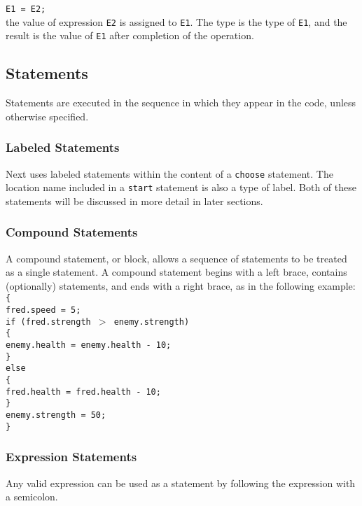 \documentclass[12pt]{article}
\begin{document}
\texttt{E1 = E2;} \\

\noindent the value of expression \texttt{E2} is assigned to \texttt{E1}.  The type is the type of \texttt{E1}, and the result is the value of \texttt{E1} after completion of the operation.

\subsection{Statements}
Statements are executed in the sequence in which they appear in the code, unless otherwise specified.

\subsubsection{Labeled Statements}
Next uses labeled statements within the content of a \texttt{choose} statement.  The location name included in a \texttt{start} statement is also a type of label.  Both of these statements will be discussed in more detail in later sections.

\subsubsection{Compound Statements}
A compound statement, or block, allows a sequence of statements to be treated as a single statement.  A compound statement begins with a left brace, contains (optionally) statements, and ends with a right brace, as in the following example: \\

\noindent \texttt{\{ \\
\indent fred.speed = 5; \\
\indent if (fred.strength $>$ enemy.strength) \\
\indent \{ \\
\indent \indent enemy.health = enemy.health - 10;  \\
\indent \} \\
\indent else \\
\indent \{ \\
\indent \indent fred.health = fred.health - 10; \\
\indent \} \\
\indent enemy.strength = 50; \\
\} }

\subsubsection{Expression Statements}
Any valid expression can be used as a statement by following the expression with a semicolon.
\end{document}
